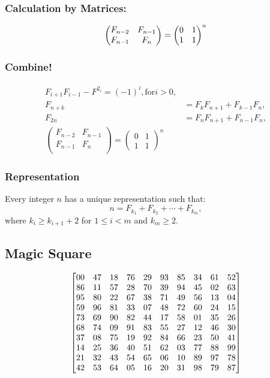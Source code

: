 \documentclass[10pt,a4paper,titlepage,twoside,draft]{article}
\theoremstyle{plain}
\theoremstyle{definition}
\theoremstyle{remark}
\begin{document}
\smallskip

\subsubsection{Calculation by Matrices:}

\begin{align}
\begin{pmatrix}
F_{n-2} &F_{n-1} \cr
F_{n-1} &F_{n} \cr
\end{pmatrix}
=
\begin{pmatrix}
0 &1 \cr
1 &1 \cr
\end{pmatrix}^{n}
\end{align}
\medskip

\subsubsection{Combine!}

\begin{align}
F_{i+1} F_{i-1} - F^{2_{i}} = (-1)^{i}, \text{for} i > 0,\\
F_{n+k} &= F_{k} F_{n+1} + F_{k-1} F_{n}, \\
F_{2n} &= F_{n} F_{n+1} + F_{n-1} F_{n}, \\
\begin{pmatrix}
F_{n-2} & F_{n-1} \\
F_{n-1} & F_{n} \\
\end{pmatrix}
=
\begin{pmatrix}
0 & 1 \\
1 &1 
\end{pmatrix}^{n}
\end{align}


\subsubsection{Representation}

Every integer $n$ has a unique representation such that:
\[ n = F_{k_1} + F_{k_2} + \cdots + F_{k_{m}},\]
where $k_{i} \geq k_{i+1} + 2$ for $1 \leq i < m$ and $k_{m} \geq 2$.

\subsection{Magic Square}

\[\left [
\begin{matrix}
00	&47	&18	&76	&29	&93	&85      &34      &61      &52     \cr
86	&11	&57	&28	&70	&39	&94      &45      &02      &63     \cr
95	&80	&22	&67	&38	&71	&49      &56      &13      &04     \cr
59	&96	&81	&33	&07	&48	&72      &60      &24      &15     \cr
73	&69	&90	&82	&44	&17	&58      &01      &35      &26     \cr
68	&74	&09	&91	&83	&55	&27      &12      &46      &30     \cr
37	&08	&75	&19	&92	&84	&66      &23      &50      &41     \cr
14	&25	&36	&40	&51	&62	&03      &77      &88      &99     \cr
21	&32	&43	&54	&65	&06	&10      &89      &97      &78     \cr
42	&53	&64	&05	&16	&20	&31      &98      &79      &87     \cr
\end{matrix}
\right ] \]
\end{document}
